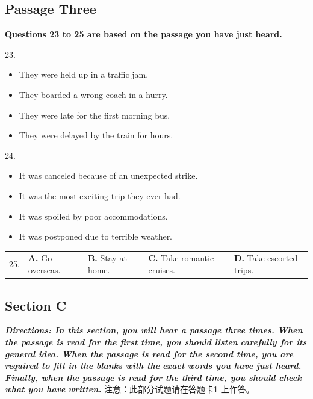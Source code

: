 \documentclass[UTF8,11pt]{ctexart}
\begin{document}
\subsection*{\textbf{Passage Three}}


\textbf{Questions 23 to 25 are based on the passage you have just heard.}


23.


\begin{itemize}[leftmargin=2em,itemsep=.2em,topsep=.4em]\item[A.] They were held up in a traffic jam.
\item[B.] They boarded a wrong coach in a hurry.
\item[C.] They were late for the first morning bus.
\item[D.] They were delayed by the train for hours.
\end{itemize}

24.


\begin{itemize}[leftmargin=2em,itemsep=.2em,topsep=.4em]\item[A.] It was canceled because of an unexpected strike.
\item[B.] It was the most exciting trip they ever had.
\item[C.] It was spoiled by poor accommodations.
\item[D.] It was postponed due to terrible weather.
\end{itemize}

\noindent\begin{tabularx}{\linewidth}{@{}lXXXX@{}}25. & \textbf{A.} Go overseas. & \textbf{B.} Stay at home. & \textbf{C.} Take romantic cruises. & \textbf{D.} Take escorted trips.\\\end{tabularx}\par

\subsection*{\textbf{Section C}}


\textbf{\textit{Directions: In this section, you will hear a passage three times. When the passage is read for the first time, you should listen}} \textbf{\textit{carefully for its general idea. When the passage is read for the second time, you are required to fill in the blanks with the}} \textbf{\textit{exact words you have just heard. Finally, when the passage is read for the third time, you should check what you have}} \textbf{\textit{written.}} 注意：此部分试题请在答题卡1 上作答。
\end{document}
